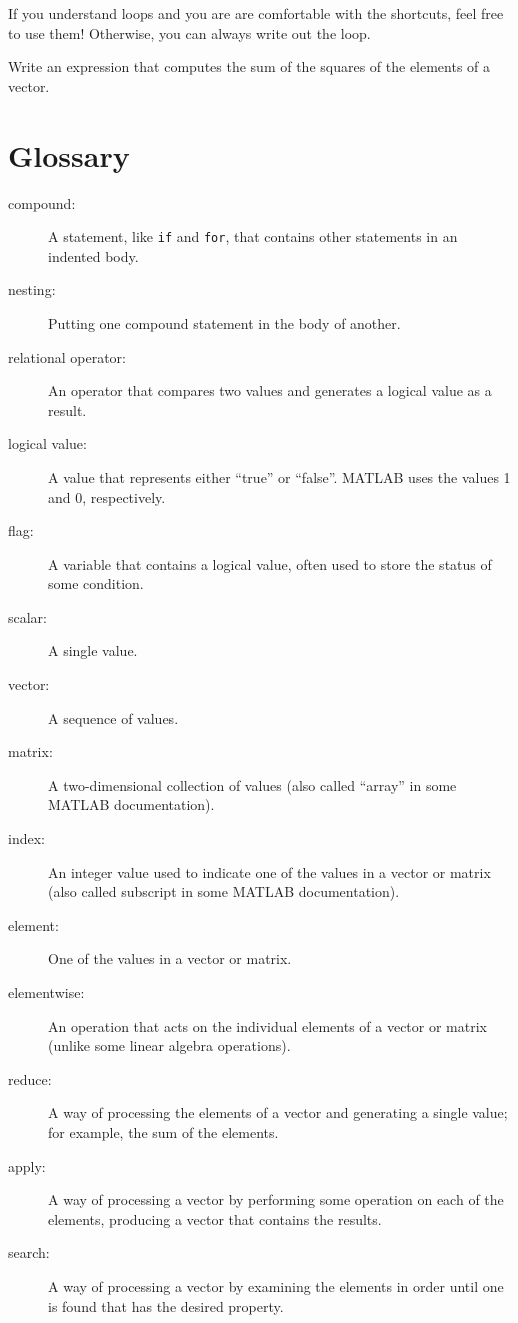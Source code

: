 \documentclass{book}
\begin{document}
If you understand loops and you are are comfortable with the
shortcuts, feel free to use them!  Otherwise, you can always write
out the loop.

\begin{ex}
Write an expression that computes the sum of the
squares of the elements of a vector.
\end{ex}


\section{Glossary}

\begin{description}

\item[compound:] A statement, like {\tt if} and {\tt for}, that
contains other statements in an indented body.

\item[nesting:] Putting one compound statement in the body of another.

\item[relational operator:] An operator that compares two values and
generates a logical value as a result.

\item[logical value:] A value that represents either ``true'' or
``false''.  MATLAB uses the values 1 and 0, respectively.

\item[flag:] A variable that contains a logical value, often used
to store the status of some condition.

\item[scalar:] A single value.

\item[vector:] A sequence of values.

\item[matrix:] A two-dimensional collection of values (also called
``array'' in some MATLAB documentation).

\item[index:] An integer value used to indicate one of the values
in a vector or matrix (also called subscript in some MATLAB documentation).

\item[element:] One of the values in a vector or matrix.

\item[elementwise:] An operation that acts on the individual elements
of a vector or matrix (unlike some linear algebra operations).

\item[reduce:] A way of processing the elements of a vector and
generating a single value; for example, the sum of the elements.

\item[apply:] A way of processing a vector by performing some operation
on each of the elements, producing a vector that contains the
results.

\item[search:] A way of processing a vector by examining the
elements in order until one is found that has the desired property.

\end{description}
\end{document}
